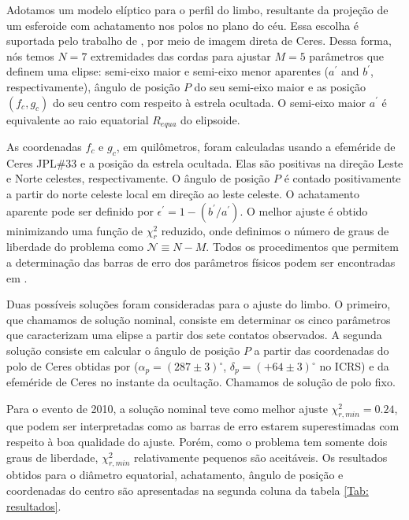 \documentclass[12pt,a4paper]{monografia}
\newcommand{\degr}{\ensuremath{^{\circ}}}%
\begin{document}
Adotamos um modelo elíptico para o perfil do limbo, resultante da projeção de um esferoide com achatamento nos polos no plano do céu. Essa escolha é suportada pelo trabalho de \cite{Drummond2014}, por meio de imagem direta de Ceres. Dessa forma, nós temos $N=7$ extremidades das cordas para ajustar $M=5$ parâmetros que definem uma elipse: semi-eixo maior e semi-eixo menor aparentes ($a^\prime$ and $b^\prime$, respectivamente), ângulo de posição $P$ do seu semi-eixo maior e as posição $(f_c,g_c)$ do seu centro com respeito à estrela ocultada. O semi-eixo maior {$a^\prime$} é equivalente ao raio equatorial $R_{equa}$ do elipsoide.

As coordenadas $f_{c}$ e $g_{c}$, em quilômetros, foram calculadas usando a efeméride de Ceres JPL\#33 \citep{Giorgini1996} e a posição da estrela ocultada. Elas são positivas na direção Leste e Norte celestes, respectivamente. O ângulo de posição $P$ é contado positivamente a partir do norte celeste local em direção ao leste celeste. O achatamento aparente pode ser definido por $\epsilon^\prime = 1 - (b^\prime/a^\prime)$. O melhor ajuste é obtido minimizando uma função de $\chi^{2}_{r}$ reduzido, onde definimos o número de graus de liberdade do problema como $\mathcal{N} \equiv N - M$. Todos os procedimentos que permitem a determinação das barras de erro dos parâmetros físicos podem ser encontradas em \cite{Braga-Ribas2013}.

Duas possíveis soluções foram consideradas para o ajuste do limbo. O primeiro, que chamamos de solução nominal, consiste em determinar os cinco parâmetros que caracterizam uma elipse a partir dos sete contatos observados. A segunda solução consiste em calcular o ângulo de posição $P$ a partir das coordenadas do polo de Ceres obtidas por \cite{Drummond2014} ($\alpha_{p} = (287 \pm 3) \degr$, $\delta_{p} = (+64 \pm 3) \degr$ no ICRS) e da efeméride de Ceres no instante da ocultação. Chamamos de solução de polo fixo.

Para o evento de 2010, a solução nominal teve como melhor ajuste $\chi^2_{r,min} = 0.24$, que podem ser interpretadas como as barras de erro estarem superestimadas com respeito à boa qualidade do ajuste. Porém, como o problema tem somente dois graus de liberdade, $\chi^2_{r,min}$ relativamente pequenos são aceitáveis. Os resultados obtidos para o diâmetro equatorial, achatamento, ângulo de posição e coordenadas do centro são apresentadas na segunda coluna da tabela \ref{Tab: resultados}.
\end{document}
